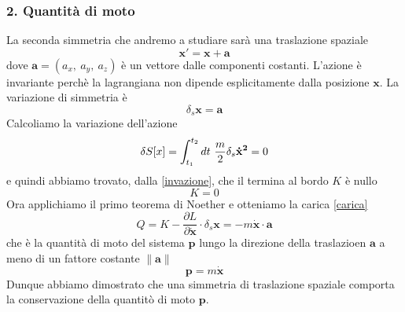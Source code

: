 \begin{example}
\subsubsection{2. Quantità di moto}
    La seconda simmetria che andremo a studiare sarà una traslazione spaziale
\begin{equation}
    \mathbf x' = \mathbf x + \mathbf a
\end{equation}
    dove $\mathbf a = (a_x,~a_y,~a_z)$ è un vettore dalle componenti costanti. L'azione è invariante perchè la lagrangiana non dipende esplicitamente dalla posizione $\mathbf{x}$. La variazione di simmetria è 
\begin{equation*}
    \delta_s \mathbf x = \mathbf a
\end{equation*}
    Calcoliamo la variazione dell'azione
\begin{equation}
    \delta S[x] = \int_{t_1}^{t_2}dt~ \frac{m}{2} \delta_s \mathbf{\dot x^2} = 0
\end{equation}
    e quindi abbiamo trovato, dalla \eqref{invazione}, che il termina al bordo $K$ è nullo
\begin{equation*}
    K = 0
\end{equation*}
    Ora applichiamo il primo teorema di Noether e otteniamo la carica \eqref{carica} 
\begin{equation}
    Q = K - \frac{\partial L}{\partial \mathbf{\dot x}} \cdot \delta_s \mathbf x = - m \mathbf{\dot x} \cdot \mathbf a
\end{equation}
    che è la quantità di moto del sistema $\mathbf p$ lungo la direzione della traslazioen $\mathbf a$ a meno di un fattore costante $\|\mathbf a \|$
\begin{equation*}
    \mathbf p = m \mathbf{\dot x}
\end{equation*}
    Dunque abbiamo dimostrato che una simmetria di traslazione spaziale comporta la conservazione della quantitò di moto $\mathbf p$.


\end{example}
